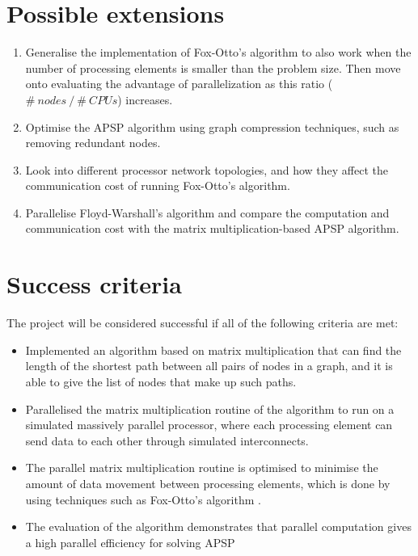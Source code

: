\documentclass[../dissertation/diss.tex]{subfiles}
\begin{document}
\section*{Possible extensions}%
\label{sec:Possible extensions}

\begin{enumerate}
    \item Generalise the implementation of Fox-Otto's algorithm to also work when
        the number of processing elements is smaller than the problem size.
        Then move onto evaluating the advantage of parallelization as this ratio
        ( $\#~nodes~/~\#~CPUs$) increases.
    \item Optimise the APSP algorithm using graph compression techniques, such as
        removing redundant nodes.
    \item Look into different processor network topologies, and how they affect
        the communication cost of running Fox-Otto's algorithm.
    \item Parallelise Floyd-Warshall's algorithm and compare the
        computation and communication cost with the matrix multiplication-based
        APSP algorithm.
\end{enumerate}

\section*{Success criteria}%
\label{sec:Success criteria}

The project will be considered successful if all of the following criteria are met:
\begin{itemize}
    \item Implemented an algorithm based on matrix multiplication that can find the
        length of the shortest path between all pairs of nodes in a graph, and it is able
        to give the list of nodes that make up such paths.
    \item Parallelised the matrix multiplication routine of the algorithm to run on a simulated
        massively parallel processor, where each processing element can send data to each
        other through simulated interconnects.
    \item The parallel matrix multiplication routine is optimised to minimise the
        amount of data movement between processing elements, which is done
        by using techniques such as Fox-Otto's algorithm \cite{fox}.
    \item The evaluation of the algorithm demonstrates that parallel computation gives
        a high parallel efficiency for solving APSP
\end{itemize}
\end{document}
